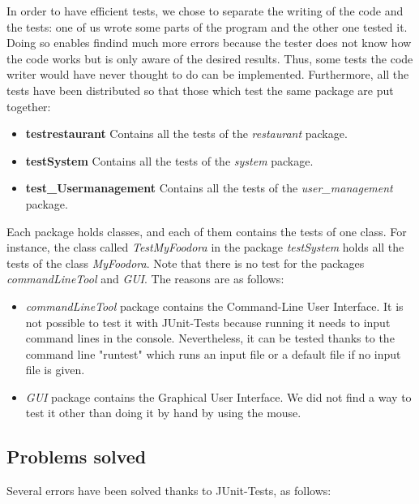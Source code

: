 In order to have efficient tests, we chose to separate the writing of the code and the tests: one of us wrote some parts of the program and the other one tested it. Doing so enables findind much more errors because the tester does not know how the code works but is only aware of the desired results. Thus, some tests the code writer would have never thought to do can be implemented.
Furthermore, all the tests have been distributed so that those which test the same package are put together:
\begin{itemize}
	\item{\textbf{testrestaurant}} Contains all the tests of the \textit{restaurant} package.
	\item{\textbf{testSystem}} Contains all the tests of the  \textit{system} package.
	\item{\textbf{test\_Usermanagement}} Contains all the tests of the \textit{user\_management} package.
\end{itemize}
Each package holds classes, and each of them contains the tests of one class. For instance, the class called \textit{TestMyFoodora} in the package \textit{testSystem} holds all the tests of the class \textit{MyFoodora}.  
Note that there is no test for the packages \textit{commandLineTool} and \textit{GUI}. The reasons are as follows:
\begin{itemize}
	\item{\textit{commandLineTool}} package contains the Command-Line User Interface. It is not possible to test it with JUnit-Tests because running it needs to input command lines in the console. Nevertheless, it can be tested thanks to the command line "runtest" which runs an input file or a default file if no input file is given.
	\item{\textit{GUI}} package contains the Graphical User Interface. We did not find a way to test it other than doing it by hand by using the mouse.
\end{itemize}

\subsection{Problems solved}
\label{sub:problems_solved}

Several errors have been solved thanks to JUnit-Tests, as follows:

